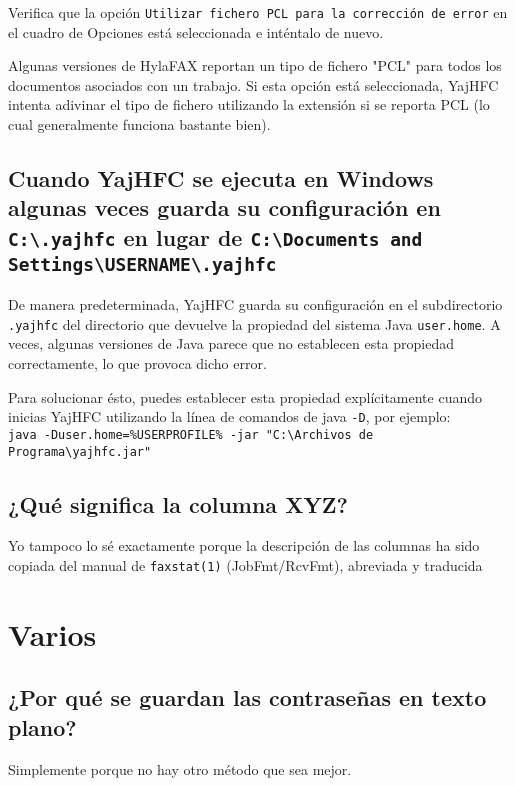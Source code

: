 \documentclass[a4paper,10pt]{scrartcl}
\begin{document}
Verifica que la opción \texttt{Utilizar fichero PCL para la corrección de error} en el 
cuadro de Opciones está seleccionada e inténtalo de nuevo.
 
Algunas versiones de HylaFAX reportan 
un tipo de fichero "PCL" para todos los documentos asociados con un trabajo. 
Si esta opción está seleccionada, YajHFC intenta adivinar el tipo de fichero 
utilizando la extensión si se reporta PCL (lo cual generalmente funciona bastante bien).

\subsection{Cuando YajHFC se ejecuta en Windows algunas veces guarda su configuración en \texttt{C:\textbackslash .yajhfc} en lugar de \texttt{C:\textbackslash Documents and Settings\textbackslash USERNAME\textbackslash .yajhfc}}

De manera predeterminada, YajHFC guarda su configuración en el subdirectorio \texttt{.yajhfc} del directorio que devuelve
la propiedad del sistema Java \texttt{user.home}.
A veces, algunas versiones de Java parece que no establecen esta propiedad correctamente, lo que provoca dicho error.

Para solucionar ésto, puedes establecer esta propiedad explícitamente cuando inicias YajHFC utilizando la línea de comandos de java \texttt{-D}, por ejemplo:\\
\texttt{java -Duser.home=\%USERPROFILE\% -jar "C:\textbackslash Archivos de Programa\textbackslash yajhfc.jar"}

\subsection{¿Qué significa la columna XYZ?}

Yo tampoco lo sé exactamente porque la descripción de las columnas ha sido copiada del manual de  \verb#faxstat(1)# (JobFmt/RcvFmt), abreviada y traducida

\section{Varios}

\subsection{¿Por qué se guardan las contraseñas en texto plano?}

Simplemente porque no hay otro método que sea mejor.
\end{document}

